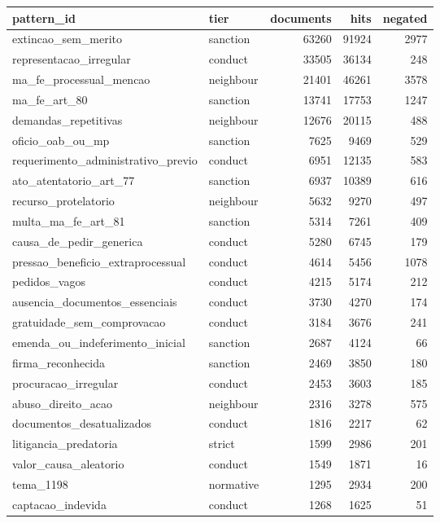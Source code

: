 \begin{table}[htbp]
\centering
\label{tab:pattern_hits}
\begin{tabular}{llrrr}
\toprule
pattern\_id & tier & documents & hits & negated \\
\midrule
extincao\_sem\_merito & sanction & 63260 & 91924 & 2977 \\
representacao\_irregular & conduct & 33505 & 36134 & 248 \\
ma\_fe\_processual\_mencao & neighbour & 21401 & 46261 & 3578 \\
ma\_fe\_art\_80 & sanction & 13741 & 17753 & 1247 \\
demandas\_repetitivas & neighbour & 12676 & 20115 & 488 \\
oficio\_oab\_ou\_mp & sanction & 7625 & 9469 & 529 \\
requerimento\_administrativo\_previo & conduct & 6951 & 12135 & 583 \\
ato\_atentatorio\_art\_77 & sanction & 6937 & 10389 & 616 \\
recurso\_protelatorio & neighbour & 5632 & 9270 & 497 \\
multa\_ma\_fe\_art\_81 & sanction & 5314 & 7261 & 409 \\
causa\_de\_pedir\_generica & conduct & 5280 & 6745 & 179 \\
pressao\_beneficio\_extraprocessual & conduct & 4614 & 5456 & 1078 \\
pedidos\_vagos & conduct & 4215 & 5174 & 212 \\
ausencia\_documentos\_essenciais & conduct & 3730 & 4270 & 174 \\
gratuidade\_sem\_comprovacao & conduct & 3184 & 3676 & 241 \\
emenda\_ou\_indeferimento\_inicial & sanction & 2687 & 4124 & 66 \\
firma\_reconhecida & sanction & 2469 & 3850 & 180 \\
procuracao\_irregular & conduct & 2453 & 3603 & 185 \\
abuso\_direito\_acao & neighbour & 2316 & 3278 & 575 \\
documentos\_desatualizados & conduct & 1816 & 2217 & 62 \\
litigancia\_predatoria & strict & 1599 & 2986 & 201 \\
valor\_causa\_aleatorio & conduct & 1549 & 1871 & 16 \\
tema\_1198 & normative & 1295 & 2934 & 200 \\
captacao\_indevida & conduct & 1268 & 1625 & 51 \\

\end{tabular}
\end{table}
